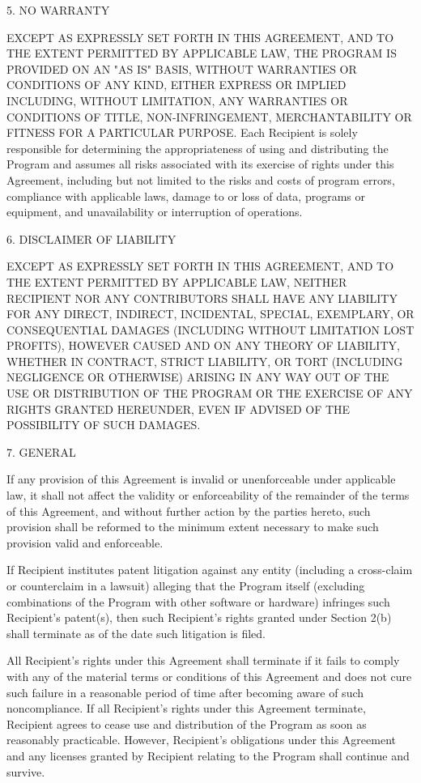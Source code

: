 5. NO WARRANTY

EXCEPT AS EXPRESSLY SET FORTH IN THIS AGREEMENT, AND TO THE EXTENT
PERMITTED BY APPLICABLE LAW, THE PROGRAM IS PROVIDED ON AN "AS IS"
BASIS, WITHOUT WARRANTIES OR CONDITIONS OF ANY KIND, EITHER EXPRESS OR
IMPLIED INCLUDING, WITHOUT LIMITATION, ANY WARRANTIES OR CONDITIONS OF
TITLE, NON-INFRINGEMENT, MERCHANTABILITY OR FITNESS FOR A PARTICULAR
PURPOSE. Each Recipient is solely responsible for determining the
appropriateness of using and distributing the Program and assumes all
risks associated with its exercise of rights under this Agreement,
including but not limited to the risks and costs of program errors,
compliance with applicable laws, damage to or loss of data, programs
or equipment, and unavailability or interruption of operations.

6. DISCLAIMER OF LIABILITY

EXCEPT AS EXPRESSLY SET FORTH IN THIS AGREEMENT, AND TO THE EXTENT
PERMITTED BY APPLICABLE LAW, NEITHER RECIPIENT NOR ANY CONTRIBUTORS
SHALL HAVE ANY LIABILITY FOR ANY DIRECT, INDIRECT, INCIDENTAL, SPECIAL,
EXEMPLARY, OR CONSEQUENTIAL DAMAGES (INCLUDING WITHOUT LIMITATION LOST
PROFITS), HOWEVER CAUSED AND ON ANY THEORY OF LIABILITY, WHETHER IN
CONTRACT, STRICT LIABILITY, OR TORT (INCLUDING NEGLIGENCE OR OTHERWISE)
ARISING IN ANY WAY OUT OF THE USE OR DISTRIBUTION OF THE PROGRAM OR THE
EXERCISE OF ANY RIGHTS GRANTED HEREUNDER, EVEN IF ADVISED OF THE
POSSIBILITY OF SUCH DAMAGES.

7. GENERAL

If any provision of this Agreement is invalid or unenforceable under
applicable law, it shall not affect the validity or enforceability of
the remainder of the terms of this Agreement, and without further
action by the parties hereto, such provision shall be reformed to the
minimum extent necessary to make such provision valid and enforceable.

If Recipient institutes patent litigation against any entity
(including a cross-claim or counterclaim in a lawsuit) alleging that the
Program itself (excluding combinations of the Program with other software
or hardware) infringes such Recipient's patent(s), then such Recipient's
rights granted under Section 2(b) shall terminate as of the date such
litigation is filed.

All Recipient's rights under this Agreement shall terminate if it
fails to comply with any of the material terms or conditions of this
Agreement and does not cure such failure in a reasonable period of
time after becoming aware of such noncompliance. If all Recipient's
rights under this Agreement terminate, Recipient agrees to cease use
and distribution of the Program as soon as reasonably practicable.
However, Recipient's obligations under this Agreement and any licenses
granted by Recipient relating to the Program shall continue and survive.

